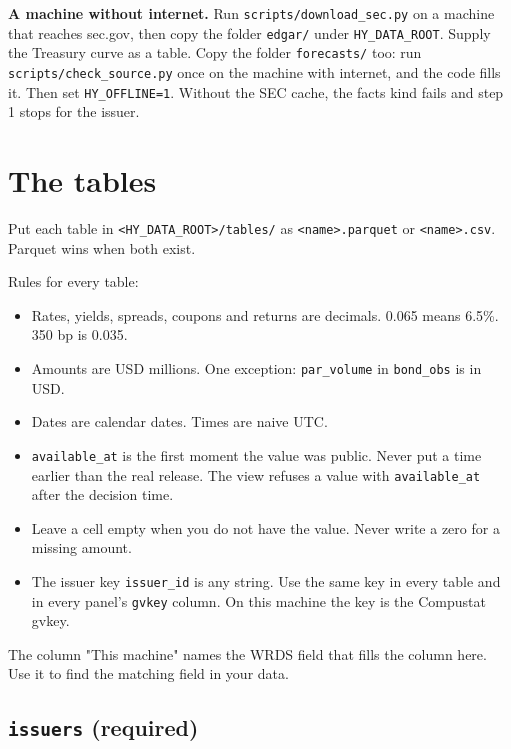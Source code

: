 \documentclass[10.5pt,a4paper]{article}
\newcommand{\code}[1]{\texttt{\small #1}}
\begin{document}
\textbf{A machine without internet.} Run \code{scripts/\allowbreak{}download\_\allowbreak{}sec.py} on a machine that reaches sec.gov, then copy the folder \code{edgar/\allowbreak{}} under \code{HY\_\allowbreak{}DATA\_\allowbreak{}ROOT}. Supply the Treasury curve as a table. Copy the folder \code{forecasts/\allowbreak{}} too: run \code{scripts/\allowbreak{}check\_\allowbreak{}source.py} once on the machine with internet, and the code fills it. Then set \code{HY\_\allowbreak{}OFFLINE=1}. Without the SEC cache, the facts kind fails and step 1 stops for the issuer.

\section{The tables}

Put each table in \code{<HY\_\allowbreak{}DATA\_\allowbreak{}ROOT>/\allowbreak{}tables/\allowbreak{}} as \code{<name>.parquet} or \code{<name>.csv}. Parquet wins when both exist.

Rules for every table:

\begin{itemize}
\item Rates, yields, spreads, coupons and returns are decimals. 0.065 means 6.5\%. 350 bp is 0.035.
\item Amounts are USD millions. One exception: \code{par\_\allowbreak{}volume} in \code{bond\_\allowbreak{}obs} is in USD.
\item Dates are calendar dates. Times are naive UTC.
\item \code{available\_\allowbreak{}at} is the first moment the value was public. Never put a time earlier than the real release. The view refuses a value with \code{available\_\allowbreak{}at} after the decision time.
\item Leave a cell empty when you do not have the value. Never write a zero for a missing amount.
\item The issuer key \code{issuer\_\allowbreak{}id} is any string. Use the same key in every table and in every panel's \code{gvkey} column. On this machine the key is the Compustat gvkey.
\end{itemize}

The column "This machine" names the WRDS field that fills the column here. Use it to find the matching field in your data.

\subsection{\code{issuers} (required)}
\end{document}
